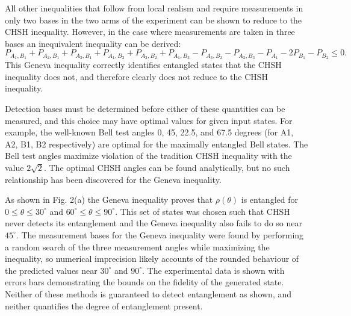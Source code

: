\documentclass[11pt]{article}
\begin{document}
All other inequalities that follow from local realism and require measurements in only two bases in the two
arms of the experiment can be shown to reduce to the CHSH inequality.  However, in the case where measurements
are taken in three bases an inequivalent inequality can be derived\cite{collins04}:
\[P_{A_1,B_1} + P_{A_2,B_1} + P_{A_3,B_1} + P_{A_1,B_2} + P_{A_2,B_2} + P_{A_1,B_3} -
P_{A_3,B_2} - P_{A_2,B_3} - P_{A_1} - 2P_{B_1} - P_{B_2} \leq 0.\]
This Geneva inequality correctly identifies entangled states that the CHSH inequality does not, and 
therefore clearly does not reduce to the CHSH inequality.

Detection bases must be determined before either of these quantities can be measured, and this choice may have 
optimal values for given input states.  For example, the well-known Bell test angles 0, 45, 22.5, and 67.5 degrees 
(for A1, A2, B1, B2 respectively) are optimal for the maximally entangled Bell states.  The
Bell test angles maximize violation of the tradition CHSH inequality with the value \(2\sqrt{2}\).  The 
optimal CHSH angles can be found analytically, but no such relationship has been discovered
for the Geneva inequality.

As shown in Fig. 2(a) \cite{altepeter05} the Geneva inequality proves that \( \rho(\theta) \) is entangled
for \(0 \leq \theta \leq 30^{\circ}\) and \(60^{\circ} \leq \theta \leq 90^{\circ}\).  This set of states was
chosen such that CHSH never detects its entanglement and the Geneva inequality also fails to do so near 
\(45^{\circ}\).  The measurement bases for the Geneva inequality were found by performing a random search of 
the three measurement angles while maximizing the inequality, so numerical imprecision likely accounts of the 
rounded behaviour of the predicted values near \(30^{\circ}\) and \(90^{\circ}\).  The experimental data is 
shown with errors bars demonstrating the bounds on the fidelity of the generated state.  Neither of these methods
is guaranteed to detect entanglement as shown, and neither quantifies the degree of entanglement present.
\end{document}
